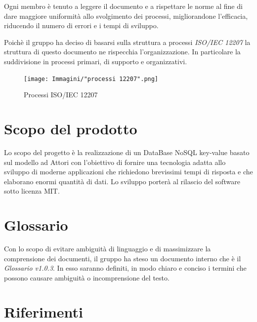 \documentclass[a4paper]{report}
\begin{document}
		Ogni membro è tenuto a leggere il documento e a rispettare le norme al fine di dare maggiore uniformità 
		allo svolgimento dei processi, 
		migliorandone l'efficacia, riducendo il numero di errori e i tempi di sviluppo.
		
		Poichè il gruppo ha deciso di basarsi sulla struttura a processi \emph{ISO/IEC 12207} 
		la struttura di questo documento ne rispecchia 
		l'organizzazione. In particolare la suddivisione in processi primari, di supporto e organizzativi.
		\begin{figure}[H]
			\centering
			\texttt{[image: Immagini/"processi 12207".png]}
			\caption{Processi ISO/IEC 12207}
		\end{figure}
	\section{Scopo del prodotto}
		Lo scopo del progetto è la realizzazione di un DataBase NoSQL key-value basato sul modello ad 
		Attori con l'obiettivo di fornire una tecnologia adatta allo sviluppo di moderne 
		applicazioni che richiedono brevissimi tempi di risposta e che elaborano enormi quantità 
		di dati. Lo sviluppo porterà al rilascio del software sotto licenza MIT.
	\section{Glossario}
		Con lo scopo di evitare ambiguità di linguaggio e di massimizzare la comprensione dei documenti, il 
      gruppo ha steso un documento interno che è il \emph{Glossario v1.0.3}. In esso saranno definiti, in modo
      chiaro e conciso i termini che possono causare ambiguità o incomprensione del testo.
	\section{Riferimenti}
\end{document}
